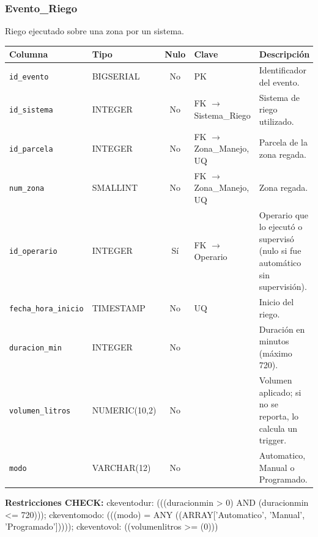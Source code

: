 \documentclass[11pt,letterpaper]{article}
\newcommand{\tbus}{\textunderscore\allowbreak}
\newcommand{\tb}[1]{{\ttfamily\let\_\tbus #1}}
\begin{document}
\subsubsection*{Evento\_Riego}
Riego ejecutado sobre una zona por un sistema.
{\footnotesize
\begin{longtable}{>{\raggedright\arraybackslash}p{3.3cm}>{\raggedright\arraybackslash}p{2.5cm}c>{\raggedright\arraybackslash}p{2.2cm}>{\raggedright\arraybackslash}p{6.1cm}}
\toprule
\textbf{Columna} & \textbf{Tipo} & \textbf{Nulo} & \textbf{Clave} & \textbf{Descripción} \\
\midrule
\endhead
\texttt{id\_evento} & BIGSERIAL & No & PK & Identificador del evento. \\
\texttt{id\_sistema} & INTEGER & No & FK $\to$ Sistema\_Riego & Sistema de riego utilizado. \\
\texttt{id\_parcela} & INTEGER & No & FK $\to$ Zona\_Manejo, UQ & Parcela de la zona regada. \\
\texttt{num\_zona} & SMALLINT & No & FK $\to$ Zona\_Manejo, UQ & Zona regada. \\
\texttt{id\_operario} & INTEGER & Sí & FK $\to$ Operario & Operario que lo ejecutó o supervisó (nulo si fue automático sin supervisión). \\
\texttt{fecha\_hora\_inicio} & TIMESTAMP & No & UQ & Inicio del riego. \\
\texttt{duracion\_min} & INTEGER & No &  & Duración en minutos (máximo 720). \\
\texttt{volumen\_litros} & NUMERIC(10,2) & No &  & Volumen aplicado; si no se reporta, lo calcula un trigger. \\
\texttt{modo} & VARCHAR(12) & No &  & Automatico, Manual o Programado. \\
\bottomrule
\end{longtable}}
{\footnotesize\raggedright\textbf{Restricciones CHECK:} \tb{ck\_evento\_dur}: \tb{(((duracion\_min > 0) AND (duracion\_min <= 720)))}; \tb{ck\_evento\_modo}: \tb{(((modo) = ANY ((ARRAY['Automatico', 'Manual', 'Programado']))))}; \tb{ck\_evento\_vol}: \tb{((volumen\_litros >= (0)))}\par}
\medskip
\end{document}
